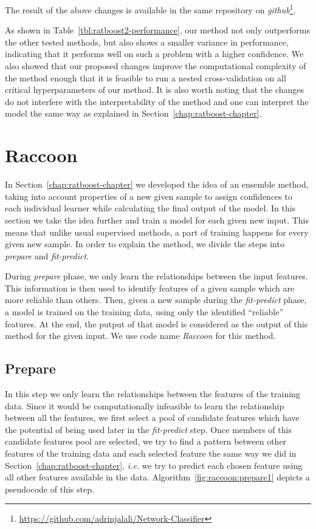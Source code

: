 The result of the above changes is available in the same repository on \emph{github}\footnote{\url{https://github.com/adrinjalali/Network-Classifier}}.

As shown in Table~\ref{tbl:ratboost2-performance}, our method not only outperforms the other tested methods, but also shows a smaller variance in performance, indicating that it performs well on such a problem with a higher confidence. We also showed that our proposed changes improve the computational complexity of the method enough that it is feasible to run a nested cross-validation on all critical hyperparameters of our method. It is also worth noting that the changes do not interfere with the interpretability of the method and one can interpret the model the same way as explained in Section~\ref{chap:ratboost-chapter}.

\section{Raccoon}
\label{sec:raccoon}
In Section~\ref{chap:ratboost-chapter} we developed the idea of an ensemble method, taking into account properties of a new given sample to assign confidences to each individual learner while calculating the final output of the model. In this section we take the idea further and train a model for each given new input. This means that unlike usual supervised methods, a part of training happens for every given new sample. In order to explain the method, we divide the steps into \emph{prepare} and \emph{fit-predict}. 

During \emph{prepare} phase, we only learn the relationships between the input features. This information is then used to identify features of a given sample which are more reliable than others. Then, given a new sample during the \emph{fit-predict} phase, a model is trained on the training data, using only the identified ``reliable'' features. At the end, the putput of that model is considered as the output of this method for the given input. We use code name \emph{Raccoon} for this method.

\subsection{Prepare}
In this step we only learn the relationships between the features of the training data. Since it would be computationally infeasible to learn the relationship between all the features, we first select a pool of candidate features which have the potential of being used later in the \emph{fit-predict} step. Once members of this candidate features pool are selected, we try to find a pattern between other features of the training data and each selected feature the same way we did in Section~\ref{chap:ratboost-chapter}, \emph{i.e.} we try to predict each chosen feature using all other features available in the data. Algorithm~\ref{fig:raccoon:prepare1} depicts a pseudocode of this step.

